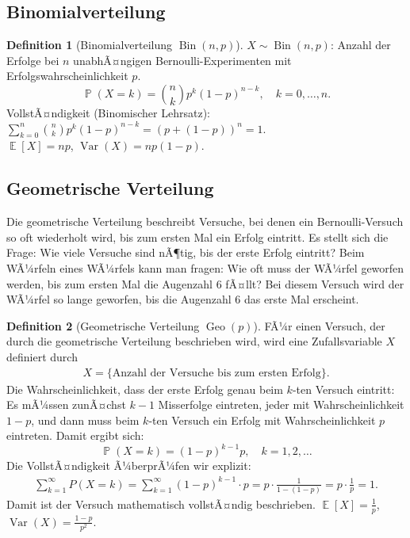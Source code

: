 ﻿\documentclass[12pt,a4paper]{article}
\theoremstyle{definition}
\newtheorem{definition}{Definition}[section]
\theoremstyle{plain}
\theoremstyle{remark}
\DeclareMathOperator{\E}{\mathbb{E}}
\DeclareMathOperator{\Var}{Var}
\DeclareMathOperator{\Prob}{\mathbb{P}}
\begin{document}
\subsection{Binomialverteilung}

\begin{definition}[Binomialverteilung $\operatorname{Bin}(n,p)$]\label{def:binom}
  $X \sim \operatorname{Bin}(n,p)$: Anzahl der Erfolge bei $n$ unabhÃ¤ngigen
  Bernoulli-Experimen\-ten mit Erfolgswahrscheinlichkeit $p$.
  \[
    \Prob(X=k) = \binom{n}{k} p^k (1-p)^{n-k}, \quad k=0,\ldots,n.
  \]
  VollstÃ¤ndigkeit (Binomischer Lehrsatz):
  $\sum_{k=0}^{n}\binom{n}{k}p^k(1-p)^{n-k} = (p+(1-p))^n = 1$. \\
  $\E[X] = np$, $\Var(X) = np(1-p)$.
\end{definition}

\subsection{Geometrische Verteilung}

Die geometrische Verteilung beschreibt Versuche, bei denen ein
Bernoulli-Versuch so oft wiederholt wird, bis zum ersten Mal ein Erfolg
eintritt. Es stellt sich die Frage: Wie viele Versuche sind nÃ¶tig, bis der
erste Erfolg eintritt? Beim WÃ¼rfeln eines WÃ¼rfels kann man fragen: Wie oft
muss der WÃ¼rfel geworfen werden, bis zum ersten Mal die Augenzahl $6$ fÃ¤llt?
Bei diesem Versuch wird der WÃ¼rfel so lange geworfen, bis die Augenzahl $6$
das erste Mal erscheint.

\begin{definition}[Geometrische Verteilung $\operatorname{Geo}(p)$]\label{def:geo}
  FÃ¼r einen Versuch, der durch die geometrische Verteilung beschrieben wird,
  wird eine Zufallsvariable $X$ definiert durch
  \begin{align}
    X = \{\text{Anzahl der Versuche bis zum ersten Erfolg}\}.
  \end{align}
  Die Wahrscheinlichkeit, dass der erste Erfolg genau beim $k$-ten Versuch
  eintritt: Es mÃ¼ssen zunÃ¤chst $k-1$ Misserfolge eintreten, jeder mit
  Wahrscheinlichkeit $1-p$, und dann muss beim $k$-ten Versuch ein Erfolg
  mit Wahrscheinlichkeit $p$ eintreten. Damit ergibt sich:
  \[
    \Prob(X=k) = (1-p)^{k-1} p, \quad k = 1, 2, \ldots
  \]
  Die VollstÃ¤ndigkeit Ã¼berprÃ¼fen wir explizit:
  \begin{align}
    \sum_{k=1}^{\infty} P(X = k)
    = \sum_{k=1}^{\infty} (1-p)^{k-1} \cdot p
    = p \cdot \frac{1}{1-(1-p)} = p \cdot \frac{1}{p} = 1.
  \end{align}
  Damit ist der Versuch mathematisch vollstÃ¤ndig beschrieben.
  $\E[X] = \frac{1}{p}$, $\Var(X) = \frac{1-p}{p^2}$.
\end{definition}
\end{document}
